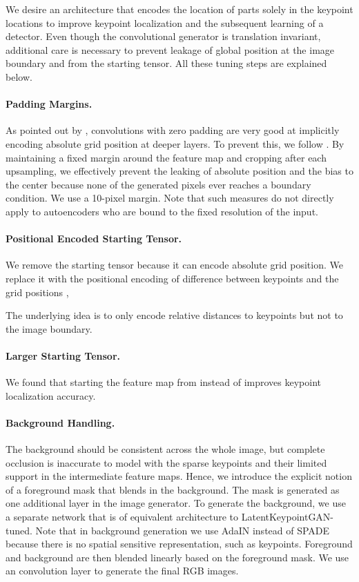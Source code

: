 \documentclass[10pt, conference, compsocconf]{IEEEtran}
\begin{document}
We desire an architecture that encodes the location of parts solely in the keypoint locations to improve keypoint localization and the subsequent learning of a detector. Even though the convolutional generator is translation invariant, additional care is necessary to prevent leakage of global position at the image boundary and from the starting tensor. All these tuning steps are explained below.

\paragraph{Padding Margins.} As pointed out by \cite{islam2020much, alsallakh2021mind, xu2020positional, kayhan2020translation}, convolutions with zero padding are very good at implicitly encoding absolute grid position at deeper layers. To prevent this, we follow \cite{karras2021alias}. By maintaining a fixed margin around the feature map and cropping after each upsampling, we effectively prevent the leaking of absolute position and the bias to the center because none of the generated pixels ever reaches a boundary condition. We use a 10-pixel margin. Note that such measures do not directly apply to autoencoders who are bound to the fixed resolution of the input.

\paragraph{Positional Encoded Starting Tensor.} We remove the  starting tensor because it can encode absolute grid position. We replace it with the positional encoding  of difference between keypoints  and the grid positions , 

The underlying idea is to only encode relative distances to keypoints but not to the image boundary.

\paragraph{Larger Starting Tensor.} We found that starting the feature map from  instead of  improves keypoint localization accuracy. 


\paragraph{Background Handling.} The background should be consistent across the whole image, but complete occlusion is inaccurate to model with the sparse keypoints and their limited support in the intermediate feature maps. Hence, we introduce the explicit notion of a foreground mask that blends in the background. The mask is generated as one additional layer in the image generator. To generate the background, we use a separate network that is of equivalent architecture to LatentKeypointGAN-tuned. Note that in background generation we use AdaIN \cite{huang2017arbitrary} instead of SPADE because there is no spatial sensitive representation, such as keypoints. Foreground and background are then blended linearly based on the foreground mask. We use an  convolution layer to generate the final RGB images.
\end{document}
